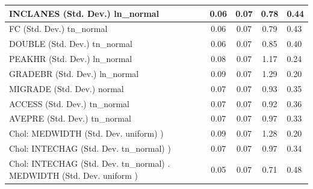 \begin{table}
\begin{center}
\begin{tabular}{|l|l|c|c|c|l|}
			INCLANES (Std. Dev.) ln_normal &  & 0.06 & 0.07 & 0.78 & 0.44 \\
			\hline
			FC (Std. Dev.) tn_normal &  & 0.06 & 0.07 & 0.79 & 0.43 \\
			\hline
			DOUBLE (Std. Dev.) tn_normal &  & 0.06 & 0.07 & 0.85 & 0.40 \\
			\hline
			PEAKHR (Std. Dev.) ln_normal &  & 0.08 & 0.07 & 1.17 & 0.24 \\
			\hline
			GRADEBR (Std. Dev.) ln_normal &  & 0.09 & 0.07 & 1.29 & 0.20 \\
			\hline
			MIGRADE (Std. Dev.) normal &  & 0.07 & 0.07 & 0.93 & 0.35 \\
			\hline
			ACCESS (Std. Dev.) tn_normal &  & 0.07 & 0.07 & 0.92 & 0.36 \\
			\hline
			AVEPRE (Std. Dev.) tn_normal &  & 0.07 & 0.07 & 0.97 & 0.33 \\
			\hline
			 Chol: MEDWIDTH (Std. Dev. uniform) ) &  & 0.09 & 0.07 & 1.28 & 0.20 \\
			\hline
			 Chol: INTECHAG (Std. Dev. tn_normal) ) &  & 0.07 & 0.07 & 0.97 & 0.34 \\
			\hline
			 Chol: INTECHAG (Std. Dev. tn_normal) . MEDWIDTH (Std. Dev.   uniform ) &  & 0.05 & 0.07 & 0.71 & 0.48 \\
			\hline
		\end{tabular}
	\end{center}
\end{table}